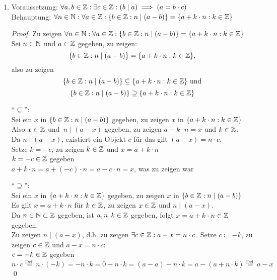 \documentclass{gadsescript}
\begin{document}
\begin{enumerate}[label=(\alph*)]
\begin{enumerate}[label=(\roman*)]
		\end{enumerate}
	\item Voraussetzung: $\forall a,b \in \mathbb{Z} : \exists c \in \mathbb{Z} : \left( b \mid a \right) \implies \left( a = b \cdot c \right) $\\
		Behauptung: $ \forall n \in \mathbb{N} : \forall a \in \mathbb{Z}:\{ b \in \mathbb{Z} : n \mid ( a - b ) \} = \{ a + k \cdot n : k \in \mathbb{Z} \} $\\
		\begin{proof}
			Zu zeigen $ \forall n \in \mathbb{N} : \forall a \in \mathbb{Z}:\{ b \in \mathbb{Z} : n \mid ( a - b ) \} = \{ a + k \cdot n : k \in \mathbb{Z} \}   $\\
			Sei $n \in \mathbb{N} $ und $a \in \mathbb{Z}$ gegeben, zu zeigen:
			\[ \{ b \in \mathbb{Z} : n \mid ( a - b ) \} = \{ a + k \cdot n : k \in \mathbb{Z} \}, \]
			also zu zeigen
			\[ \{ b \in \mathbb{Z} : n \mid ( a - b ) \} \subseteq \{ a + k \cdot n : k \in \mathbb{Z} \} \text{ und} \]
			\[ \{ b \in \mathbb{Z} : n \mid ( a - b ) \} \supseteq \{ a + k \cdot n : k \in \mathbb{Z} \} \]\par
			``$\subseteq$'':\\
			Sei ein $ x $ in $ \{ b \in \mathbb{Z} : n \mid ( a - b ) \} $ gegeben, zu zeigen $ x $ in $ \{ a + k \cdot n : k \in \mathbb{Z} \} $\\
			Also $ x \in \mathbb{Z} $ und $ \ n \mid ( a - x ) $ gegeben, zu zeigen $ a + k \cdot n = x$ und $ k \in \mathbb{Z} $.\\
			Da $ n \mid ( a - x ) $, existiert ein Objekt $ c $ für das gilt $ ( a - x ) = n \cdot c $.\\
			Setze $ k = - c$, zu zeigen $ k \in \mathbb{Z} $ und $ x = a + k \cdot n $\\
			$ k = -c \in \mathbb{Z} $ gegeben\\
			$ a + k \cdot n = a + (-c) \cdot n = a - c \cdot n = x $, was zu zeigen war\\\par
			``$\supseteq$'':\\
			Sei ein $ x $ in $ \{ a + k \cdot n : k \in \mathbb{Z} \} $ gegeben, zu zeigen $ x $ in $ \{ b \in \mathbb{Z} : n \mid ( a - b ) \} $\\
			Es gilt $ x = a + k \cdot n $ für $ k \in \mathbb{Z} $, zu zeigen $ x \in \mathbb{Z} $ und $ n \mid ( a - x ) $.\\
			Da $ n \in \mathbb{N} \subset \mathbb{Z} $ gegeben, ist $ a, n, k \in \mathbb{Z} $ gegeben, folgt $ x = a + k \cdot n \in \mathbb{Z} $ gegeben.\\
			Zu zeigen $ n \mid ( a - x ) $, d.h. zu zeigen $ \exists c \in \mathbb{Z} : a - x = n \cdot c $.
			Setze $ c \coloneqq -k$, zu zeigen $ c \in \mathbb{Z} $ und $ a - x = n \cdot c $:\\
			$ c = -k \in \mathbb{Z} $ gegeben\\
			$ n \cdot c \overset{\text{Def.}}{=} n \cdot (-k) = - n \cdot k = 0 - n \cdot k = (a - a) - n \cdot k = a - ( a + n \cdot k ) \overset{\text{Def.}}{=} a - x $\qed

		\end{proof}

\end{enumerate}
\end{document}
